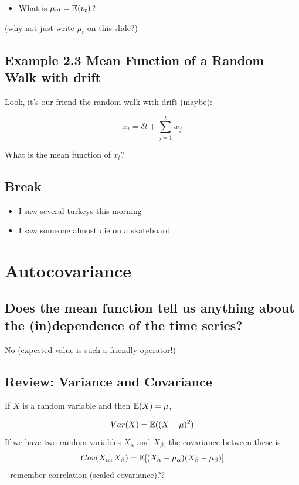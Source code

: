\documentclass[
  letterpaper,
  DIV=11,
  numbers=noendperiod]{scrreprt}
\providecommand{\tightlist}{%
  \setlength{\itemsep}{0pt}\setlength{\parskip}{0pt}}\usepackage{longtable,booktabs,array}
\begin{document}
\begin{itemize}
\tightlist
\item
  What is \(\mu_{vt} = {\mathbb{E}}(v_t)\)?
\end{itemize}

(why not just write \(\mu_t\) on this slide?)

\section{Example 2.3 Mean Function of a Random Walk with
drift}\label{example-2.3-mean-function-of-a-random-walk-with-drift}

Look, it's our friend the random walk with drift (maybe):

\[
x_t = \delta t + \sum_{j = 1}^t w_j
\]

What is the mean function of \(x_t\)?

\section{Break}\label{break}

\begin{itemize}
\tightlist
\item
  I saw several turkeys this morning
\item
  I saw someone almost die on a skateboard
\end{itemize}

\chapter{Autocovariance}\label{autocovariance}

\section{Does the mean function tell us anything about the
(in)dependence of the time
series?}\label{does-the-mean-function-tell-us-anything-about-the-independence-of-the-time-series}

No (expected value is such a friendly operator!)

\section{Review: Variance and
Covariance}\label{review-variance-and-covariance}

If \(X\) is a random variable and then \({\mathbb{E}}(X) = \mu\),

\[
Var(X) = {\mathbb{E}}((X-\mu)^2)
\] If we have two random variables \(X_\alpha\) and \(X_\beta\), the
covariance between these is \[
Cov(X_\alpha, X_\beta) = {\mathbb{E}}[(X_\alpha - \mu_\alpha)(X_\beta - \mu_\beta)]
\] - remember correlation (scaled covariance)??
\end{document}
